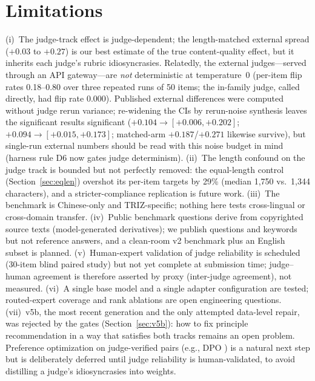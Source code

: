 \documentclass[11pt]{article}
\begin{document}
\section{Limitations}
\label{sec:limits}
(i)~The judge-track effect is judge-dependent; the length-matched
external spread ($+0.03$ to $+0.27$) is our best estimate of the true
content-quality effect, but it inherits each judge's rubric
idiosyncrasies. Relatedly, the external judges---served through an API
gateway---are \emph{not} deterministic at temperature~0 (per-item flip
rates 0.18--0.80 over three repeated runs of 50 items; the in-family
judge, called directly, had flip rate 0.000). Published external
differences were computed without judge rerun variance; re-widening
the CIs by rerun-noise synthesis leaves the significant results
significant ($+0.104 \to [+0.006, +0.202]$; $+0.094 \to [+0.015,
+0.173]$; matched-arm $+0.187$/$+0.271$ likewise survive), but
single-run external numbers should be read with this noise budget in
mind (harness rule D6 now gates judge determinism). (ii)~The length confound
on the judge track is bounded but not perfectly removed: the
equal-length control (Section~\ref{sec:eqlen}) overshot its per-item
targets by 29\% (median 1{,}750 vs.\ 1{,}344 characters), and a
stricter-compliance replication is future work. (iii)~The benchmark is
Chinese-only and TRIZ-specific; nothing here tests cross-lingual or
cross-domain transfer. (iv)~Public benchmark questions derive from
copyrighted source texts (model-generated derivatives); we publish
questions and keywords but not reference answers, and a clean-room
v2 benchmark plus an English subset is planned. (v)~Human-expert
validation of judge reliability is scheduled (30-item blind paired
study) but not yet complete at submission time; judge--human agreement
is therefore asserted by proxy (inter-judge agreement), not measured.
(vi)~A single base model and a single adapter configuration are tested;
routed-expert coverage and rank ablations are open engineering
questions. (vii)~v5b, the most recent generation and the only attempted
data-level repair, was rejected by the gates
(Section~\ref{sec:v5b}): how to fix principle recommendation in a way
that satisfies both tracks remains an open problem. Preference
optimization on judge-verified pairs (e.g., DPO \cite{dpo}) is a natural
next step but is deliberately deferred until judge reliability is
human-validated, to avoid distilling a judge's idiosyncrasies into
weights.
\end{document}
